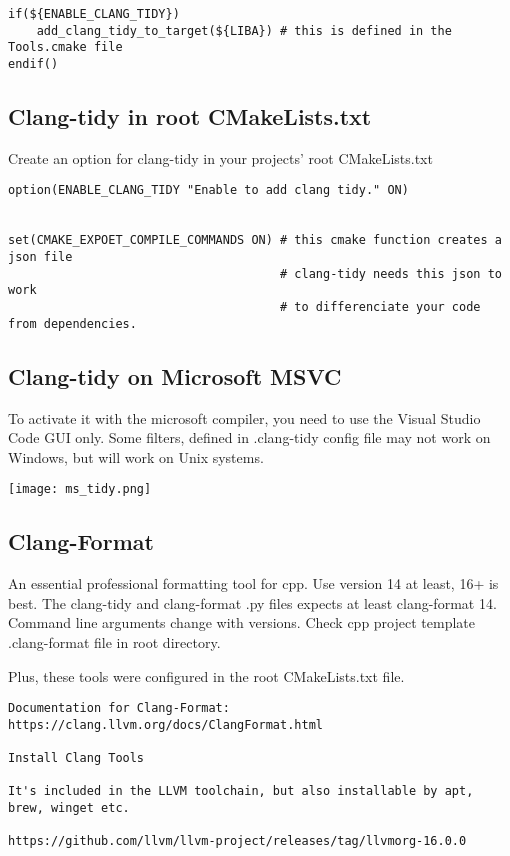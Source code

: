 \begin{verbatim}
if(${ENABLE_CLANG_TIDY})
    add_clang_tidy_to_target(${LIBA}) # this is defined in the Tools.cmake file
endif()
\end{verbatim}

\subsection{Clang-tidy in root CMakeLists.txt}

Create an option for clang-tidy in your projects' root CMakeLists.txt

\begin{verbatim}
option(ENABLE_CLANG_TIDY "Enable to add clang tidy." ON)


set(CMAKE_EXPOET_COMPILE_COMMANDS ON) # this cmake function creates a json file
                                      # clang-tidy needs this json to work
                                      # to differenciate your code from dependencies.

\end{verbatim}


\subsection{Clang-tidy on Microsoft MSVC}

To activate it with the microsoft compiler, you need to use the Visual Studio Code GUI only.
Some filters, defined in .clang-tidy config file may not work on Windows, but will work on Unix systems.

\begin{center}
    \texttt{[image: ms\_tidy.png]}
\end{center}

 
\subsection{Clang-Format}

An essential professional formatting tool for cpp. Use version 14 at least, 16+ is best. The 
clang-tidy and clang-format .py files expects at least clang-format 14. Command line arguments 
change with versions. Check cpp project template .clang-format file in root directory.

Plus, these tools were configured in the root CMakeLists.txt file.

\begin{verbatim}
Documentation for Clang-Format: https://clang.llvm.org/docs/ClangFormat.html

Install Clang Tools

It's included in the LLVM toolchain, but also installable by apt, brew, winget etc.

https://github.com/llvm/llvm-project/releases/tag/llvmorg-16.0.0
\end{verbatim}



